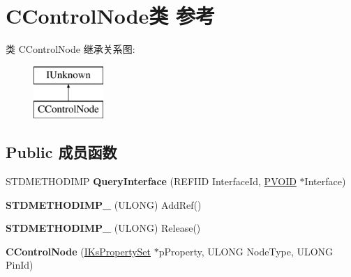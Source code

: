\hypertarget{class_c_control_node}{}\section{C\+Control\+Node类 参考}
\label{class_c_control_node}
类 C\+Control\+Node 继承关系图\+:\begin{figure}[H]
\begin{center}
\leavevmode
\includegraphics[height=2.000000cm]{class_c_control_node}
\end{center}
\end{figure}
\subsection*{Public 成员函数}
\begin{DoxyCompactItemize}
\item 
\mbox{\label{class_c_control_node_a35f849f453720571fdba2fac35401d01}} 
S\+T\+D\+M\+E\+T\+H\+O\+D\+I\+MP {\bfseries Query\+Interface} (R\+E\+F\+I\+ID Interface\+Id, \hyperlink{interfacevoid}{P\+V\+O\+ID} $\ast$Interface)
\item 
\mbox{\label{class_c_control_node_a407187859206978527a57d2c41b2c564}} 
{\bfseries S\+T\+D\+M\+E\+T\+H\+O\+D\+I\+M\+P\+\_\+} (U\+L\+O\+NG) Add\+Ref()
\item 
\mbox{\label{class_c_control_node_acca93622a57b9dade1838b86f8ea4af7}} 
{\bfseries S\+T\+D\+M\+E\+T\+H\+O\+D\+I\+M\+P\+\_\+} (U\+L\+O\+NG) Release()
\item 
\mbox{\label{class_c_control_node_a78445730cfa5ad6af8bb62eb87efbec3}} 
{\bfseries C\+Control\+Node} (\hyperlink{interface_i_ks_property_set}{I\+Ks\+Property\+Set} $\ast$p\+Property, U\+L\+O\+NG Node\+Type, U\+L\+O\+NG Pin\+Id)
\end{DoxyCompactItemize}
